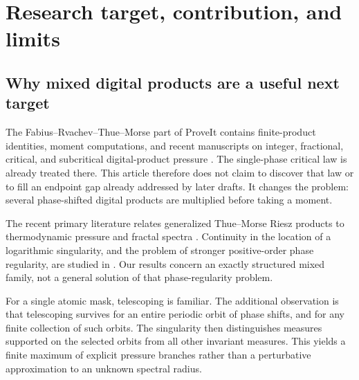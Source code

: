 \documentclass[11pt,a4paper]{article}
\numberwithin{equation}{section}
\theoremstyle{definition}
\theoremstyle{remark}
\begin{document}
\section{Research target, contribution, and limits}
\label{sec:intro}
\subsection{Why mixed digital products are a useful next target}
The Fabius--Rvachev--Thue--Morse part of ProveIt contains finite-product
identities, moment computations, and recent manuscripts on integer,
fractional, critical, and subcritical digital-product pressure
\cite{Repo,RepoIndex}. The single-phase critical law is already treated
there. This article therefore does not claim to discover that law or to
fill an endpoint gap already addressed by later drafts. It changes the
problem: several phase-shifted digital products are multiplied before
taking a moment.

The recent primary literature relates generalized Thue--Morse Riesz
products to thermodynamic pressure and fractal spectra \cite{GKS}.
Continuity in the location of a logarithmic singularity, and the problem
of stronger positive-order phase regularity, are studied in \cite{GLS}.
Our results concern an exactly structured mixed family, not a general
solution of that phase-regularity problem.

For a single atomic mask, telescoping is familiar. The additional
observation is that telescoping survives for an entire periodic orbit of
phase shifts, and for any finite collection of such orbits. The singularity
then distinguishes measures supported on the selected orbits from all
other invariant measures. This yields a finite maximum of explicit
pressure branches rather than a perturbative approximation to an unknown
spectral radius.
\end{document}

